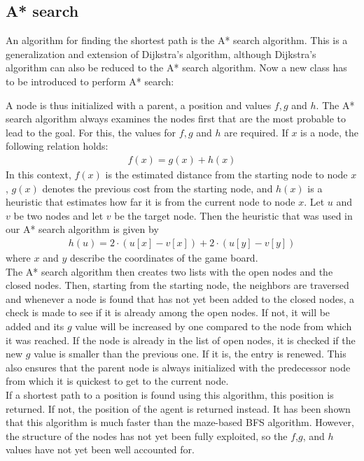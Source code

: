 \subsection{A* search}
An algorithm for finding the shortest path is the A* search algorithm. This is a generalization and extension of Dijkstra's algorithm, although Dijkstra's algorithm can also be reduced to the A* search algorithm. Now a new class has to be introduced to perform A* search:
\vspace{0.1cm}

\vspace{0.1cm}
A node is thus initialized with a parent, a position and values $f,g$ and $h$. The A* search algorithm always examines the nodes first that are the most probable to lead to the goal. For this, the values for $f,g$ and $h$ are required. If $x$ is a node, the following relation holds:
\begin{align*}
f(x) = g(x) + h(x)
\end{align*}
In this context, $f(x)$ is the estimated distance from the starting node to node $x$, $g(x)$ denotes the previous cost from the starting node, and $h(x)$ is a heuristic that estimates how far it is from the current node to node $x$. Let $u$ and $v$ be two nodes and let $v$ be the target node. Then the heuristic that was used in our A* search algorithm is given by
\begin{align*}
h(u) = 2\cdot(u[x] - v[x]) + 2\cdot(u[y]-v[y])
\end{align*}
where $x$ and $y$ describe the coordinates of the game board.
\\

The A* search algorithm then creates two lists with the open nodes and the closed nodes. Then, starting from the starting node, the neighbors are traversed and whenever a node is found that has not yet been added to the closed nodes, a check is made to see if it is already among the open nodes. If not, it will be added and its $g$ value will be increased by one compared to the node from which it was reached. If the node is already in the list of open nodes, it is checked if the new $g$ value is smaller than the previous one. If it is, the entry is renewed. This also ensures that the parent node is always initialized with the predecessor node from which it is quickest to get to the current node.
\\

If a shortest path to a position is found using this algorithm, this position is returned. If not, the position of the agent is returned instead. It has been shown that this algorithm is much faster than the maze-based BFS algorithm. However, the structure of the nodes has not yet been fully exploited, so the $f$,$g$, and $h$ values have not yet been well accounted for.

